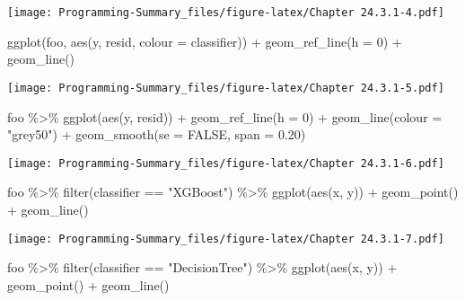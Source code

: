 \documentclass[
]{article}
\newenvironment{Shaded}{\begin{snugshade}}{\end{snugshade}}
\newcommand{\AttributeTok}[1]{\textcolor[rgb]{0.77,0.63,0.00}{#1}}
\newcommand{\ConstantTok}[1]{\textcolor[rgb]{0.00,0.00,0.00}{#1}}
\newcommand{\DecValTok}[1]{\textcolor[rgb]{0.00,0.00,0.81}{#1}}
\newcommand{\FloatTok}[1]{\textcolor[rgb]{0.00,0.00,0.81}{#1}}
\newcommand{\FunctionTok}[1]{\textcolor[rgb]{0.00,0.00,0.00}{#1}}
\newcommand{\NormalTok}[1]{#1}
\newcommand{\SpecialCharTok}[1]{\textcolor[rgb]{0.00,0.00,0.00}{#1}}
\newcommand{\StringTok}[1]{\textcolor[rgb]{0.31,0.60,0.02}{#1}}
\begin{document}
\texttt{[image: Programming-Summary\_files/figure-latex/Chapter 24.3.1-4.pdf]}

\begin{Shaded}
\begin{Highlighting}[]
\FunctionTok{ggplot}\NormalTok{(foo, }\FunctionTok{aes}\NormalTok{(y, resid, }\AttributeTok{colour =}\NormalTok{ classifier)) }\SpecialCharTok{+} 
  \FunctionTok{geom\_ref\_line}\NormalTok{(}\AttributeTok{h =} \DecValTok{0}\NormalTok{) }\SpecialCharTok{+} 
  \FunctionTok{geom\_line}\NormalTok{()}
\end{Highlighting}
\end{Shaded}

\texttt{[image: Programming-Summary\_files/figure-latex/Chapter 24.3.1-5.pdf]}

\begin{Shaded}
\begin{Highlighting}[]
\NormalTok{foo }\SpecialCharTok{\%\textgreater{}\%} 
  \FunctionTok{ggplot}\NormalTok{(}\FunctionTok{aes}\NormalTok{(y, resid)) }\SpecialCharTok{+} 
  \FunctionTok{geom\_ref\_line}\NormalTok{(}\AttributeTok{h =} \DecValTok{0}\NormalTok{) }\SpecialCharTok{+} 
  \FunctionTok{geom\_line}\NormalTok{(}\AttributeTok{colour =} \StringTok{"grey50"}\NormalTok{) }\SpecialCharTok{+} 
  \FunctionTok{geom\_smooth}\NormalTok{(}\AttributeTok{se =} \ConstantTok{FALSE}\NormalTok{, }\AttributeTok{span =} \FloatTok{0.20}\NormalTok{)}
\end{Highlighting}
\end{Shaded}

\texttt{[image: Programming-Summary\_files/figure-latex/Chapter 24.3.1-6.pdf]}

\begin{Shaded}
\begin{Highlighting}[]
\NormalTok{foo }\SpecialCharTok{\%\textgreater{}\%} 
  \FunctionTok{filter}\NormalTok{(classifier }\SpecialCharTok{==} \StringTok{"XGBoost"}\NormalTok{) }\SpecialCharTok{\%\textgreater{}\%} 
  \FunctionTok{ggplot}\NormalTok{(}\FunctionTok{aes}\NormalTok{(x, y)) }\SpecialCharTok{+} 
  \FunctionTok{geom\_point}\NormalTok{() }\SpecialCharTok{+} 
  \FunctionTok{geom\_line}\NormalTok{() }
\end{Highlighting}
\end{Shaded}

\texttt{[image: Programming-Summary\_files/figure-latex/Chapter 24.3.1-7.pdf]}

\begin{Shaded}
\begin{Highlighting}[]
\NormalTok{foo }\SpecialCharTok{\%\textgreater{}\%} 
  \FunctionTok{filter}\NormalTok{(classifier }\SpecialCharTok{==} \StringTok{"DecisionTree"}\NormalTok{) }\SpecialCharTok{\%\textgreater{}\%} 
  \FunctionTok{ggplot}\NormalTok{(}\FunctionTok{aes}\NormalTok{(x, y)) }\SpecialCharTok{+} 
  \FunctionTok{geom\_point}\NormalTok{() }\SpecialCharTok{+} 
  \FunctionTok{geom\_line}\NormalTok{() }
\end{Highlighting}
\end{Shaded}
\end{document}
